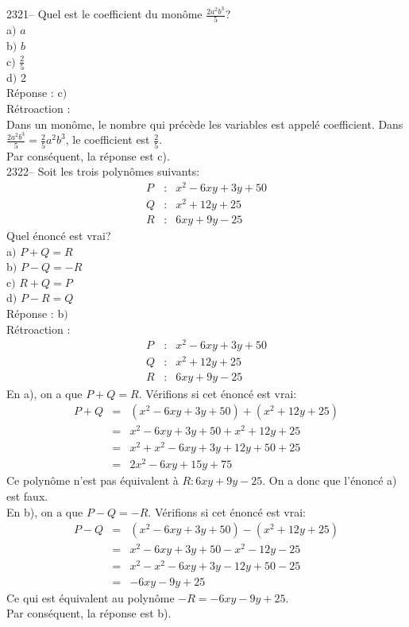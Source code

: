 \documentclass[letterpaper, 12pt]{article}
\begin{document}
2321-- Quel est le coefficient du mon\^ome $\frac{2a^{2}b^{3}}{5}$?\\

a$)$ $a$\\[2mm]
b$)$ $b$\\[2mm]
c$)$ $\frac{2}{5}$\\[2mm]
d$)$ 2\\

R\'eponse : c$)$\\

R\'etroaction :\\
Dans un mon\^ome, le nombre qui pr\'ec\`ede les variables est appel\'e coefficient. Dans $\frac{2a^{2}b^{3}}{5}=\frac{2}{5}a^{2}b^{3}$, le coefficient est $\frac{2}{5}$.\\
Par cons\'equent, la r\'eponse est c).\\


2322--  Soit les trois polyn\^omes suivants:
\begin{eqnarray*}
 P&:&x^{2}-6xy+3y+50\\
Q&:&x^{2}+12y+25\\
R&:&6xy+9y-25
\end{eqnarray*}
Quel \'enonc\'e est vrai?\\

a$)$ $P+Q=R$\\
b$)$ $P-Q=-R$\\
c$)$ $R+Q=P$\\
d$)$ $P-R=Q$\\

R\'eponse : b$)$\\

R\'etroaction :
\begin{eqnarray*}
 P&:&x^{2}-6xy+3y+50\\
Q&:&x^{2}+12y+25\\
R&:&6xy+9y-25
\end{eqnarray*}
En a), on a que $P+Q=R$. V\'erifions si cet \'enonc\'e est vrai:
\begin{eqnarray*}
 P+Q&=&(x^{2}-6xy+3y+50)+(x^{2}+12y+25)\\
&=&x^{2}-6xy+3y+50+x^{2}+12y+25\\
&=&x^{2}+x^{2}-6xy+3y+12y+50+25\\
&=&2x^{2}-6xy+15y+75
\end{eqnarray*}
Ce polyn\^ome n'est pas \'equivalent \`a $R:6xy+9y-25$. On a donc que l'\'enonc\'e a) est faux.\\
En b), on a que $P-Q=-R$. V\'erifions si cet \'enonc\'e est vrai:
\begin{eqnarray*}
 P-Q&=&(x^{2}-6xy+3y+50)-(x^{2}+12y+25)\\
&=&x^{2}-6xy+3y+50-x^{2}-12y-25\\
&=&x^{2}-x^{2}-6xy+3y-12y+50-25\\
&=&-6xy-9y+25
\end{eqnarray*}
Ce qui est \'equivalent au polyn\^ome $-R=-6xy-9y+25$.\\
Par cons\'equent, la r\'eponse est b).\\
\end{document}
